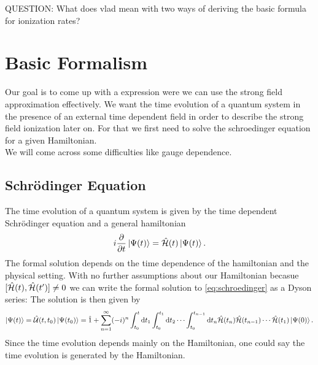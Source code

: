 QUESTION: What does vlad mean with two ways of deriving the basic formula for ionization rates?


\newpage
\section{Basic Formalism}
Our goal is to come up with a expression were we can use the strong field approximation effectively.
We want the time evolution of a quantum system in the presence of an external time dependent field in order to describe the strong field ionization later on.
For that we first need to solve the schroedinger equation for a given Hamiltonian.\\
We will come across some difficulties like gauge dependence.

\subsection{Schrödinger Equation}
The time evolution of a quantum system is given by the time dependent Schrödinger equation and a general hamiltonian
\begin{equation}
    i \frac{\partial}{\partial t} \ket{\Psi(t)} = \hat{\mathcal{H}}(t) \ket{\Psi(t)}. \label{eq:schroedinger}
\end{equation}
The formal solution depends on the time dependence of the hamiltonian and the physical setting. 
With no further assumptions about our Hamiltonian becasue $[\hat{\mathcal{H}}(t), \hat{\mathcal{H}}(t')] \neq 0$ we can write the formal solution to \eqref{eq:schroedinger} as a Dyson series:
The solution is then given by 
\begin{equation}
    \ket{\Psi(t)} = \hat{\mathcal{U}}(t,t_0)\ket{\Psi(t_0)} = \hat{1} + \sum_{n=1}^{\infty} (-i)^n \int_{t_0}^{t} \mathrm{d} t_1 \int_{t_0}^{t_1} \mathrm{d} t_2 \cdots \int_{t_0}^{t_{n-1}} \mathrm{d} t_n \hat{\mathcal{H}}(t_n) \hat{\mathcal{H}}(t_{n-1})\cdots\hat{\mathcal{H}}(t_1) \ket{\Psi(0)}. \label{eq:dyson}
\end{equation}
Since the time evolution depends mainly on the Hamiltonian, one could say the time evolution is generated by the Hamiltonian.





